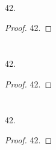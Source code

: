 \documentclass[
  coursecode={MTHE 474},
  assignmentname={Homework \homeworknumber},
  studentnumber=20053722,
  name={Bryan Hoang},
  draft,
]{
  ltxanswer%
}
\begin{document}
  \begin{questions}
    \setcounter{question}{\questionnumber}
    \addtocounter{question}{-1}
    \question[15]\
    \begin{parts}
      \part{}
      \begin{solution}
        \begin{claim}
          42.
        \end{claim}
        \begin{proof}
          42.
        \end{proof}
      \end{solution}

      \part{}
      \begin{solution}
        \begin{claim}
          42.
        \end{claim}
        \begin{proof}
          42.
        \end{proof}
      \end{solution}

      \part{}
      \begin{solution}
        \begin{claim}
          42.
        \end{claim}
        \begin{proof}
          42.
        \end{proof}
      \end{solution}
    \end{parts}
  \end{questions}
\end{document}
